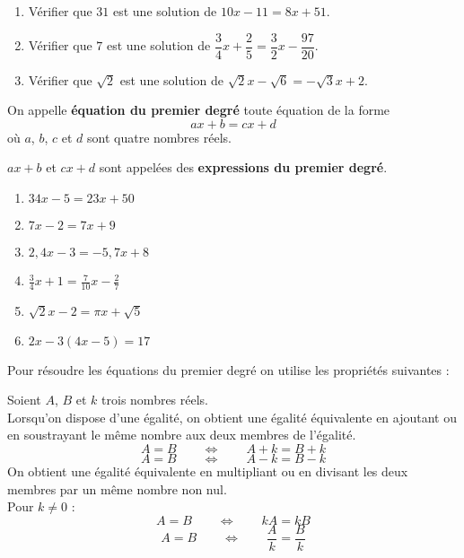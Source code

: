 \documentclass[a4paper,11pt,cours]{nsi}
\begin{document}

\begin {exercice}
\begin{enumerate}
	\item Vérifier que $31$ est une solution de $10x-11 = 8x +51$.
	\item Vérifier que $7$ est une solution de $\dfrac{3}{4}x+\dfrac{2}{5}=\dfrac{3}{2}x-\dfrac{97}{20}$.
	\item Vérifier que $\sqrt{2}$ est une solution de $\sqrt{2}x-\sqrt{6}=-\sqrt{3}x+2$.	
\end{enumerate}
\end {exercice}

\begin{definition}
	On appelle \textbf{équation du premier degré} toute équation de la forme
	$$ax+b = cx+d$$
	où $a$, $b$, $c$ et $d$ sont quatre nombres réels.
\end{definition}

\begin{remarque}
	$ax+b$ et $cx+d$ sont appelées des \textbf{expressions du premier degré}.
\end{remarque}

\begin{exemple}[s]
	\begin{multicols}{3}
		\begin{enumerate}[label=\textbullet]
			\item 	$34x-5=23x+50$
			\item 	$7x-2=7x+9$
			\item 	$2,4x-3=-5,7x+8$
			\item	$\displaystyle\frac{3}{4}x+1=\frac{7}{10}x-\frac{2}{7}$
			\item 	$\sqrt{2}x-2=\pi x +\sqrt{5}$
			\item	$2x-3(4x-5)=17$
		\end{enumerate}
	\end{multicols}
\end{exemple}

Pour résoudre les équations du premier degré on utilise les propriétés suivantes :

\begin{propriete}[s]
	Soient $A$, $B$ et $k$ trois nombres réels.\\
	Lorsqu'on dispose d'une égalité, on obtient une égalité équivalente en ajoutant ou en soustrayant le même nombre aux deux membres de 
	l'égalité.
	$$A=B\qquad \Longleftrightarrow\qquad A+k=B+k$$
	$$A=B\qquad \Longleftrightarrow\qquad A-k=B-k$$
	On obtient une égalité équivalente en multipliant ou en divisant les deux membres par un  même nombre non nul.\\
	Pour $k\neq 0$ :
	$$A=B\qquad \Longleftrightarrow\qquad kA=kB$$
	$$A=B\qquad \Longleftrightarrow\qquad \dfrac{A}{k}=\dfrac{B}{k}$$
\end{propriete}
\end{document}
